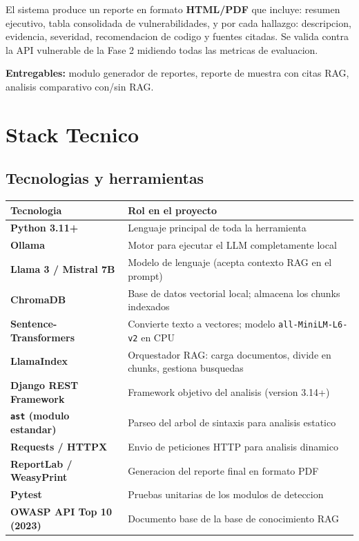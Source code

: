 \documentclass[12pt, a4paper]{article}
\begin{document}
\begin{dangerbox}[title={Fase 7 --- Generacion del reporte y validacion}]
El sistema produce un reporte en formato \textbf{HTML/PDF} que incluye: resumen ejecutivo, tabla consolidada de vulnerabilidades, y por cada hallazgo: descripcion, evidencia, severidad, recomendacion de codigo y fuentes citadas. Se valida contra la API vulnerable de la Fase 2 midiendo todas las metricas de evaluacion.

\smallskip
\textbf{Entregables:} modulo generador de reportes, reporte de muestra con citas RAG, analisis comparativo con/sin RAG.
\end{dangerbox}

\newpage
\section{Stack Tecnico}

\subsection{Tecnologias y herramientas}

\begin{center}
\begin{tabularx}{\linewidth}{>{\bfseries}lL}
\toprule
\textbf{Tecnologia} & \textbf{Rol en el proyecto} \\
\midrule
Python 3.11+ & Lenguaje principal de toda la herramienta \\
Ollama & Motor para ejecutar el LLM completamente local \\
Llama 3 / Mistral 7B & Modelo de lenguaje (acepta contexto RAG en el prompt) \\
ChromaDB & Base de datos vectorial local; almacena los chunks indexados \\
Sentence-Transformers & Convierte texto a vectores; modelo \texttt{all-MiniLM-L6-v2} en CPU \\
LlamaIndex & Orquestador RAG: carga documentos, divide en chunks, gestiona busquedas \\
Django REST Framework & Framework objetivo del analisis (version 3.14+) \\
\texttt{ast} (modulo estandar) & Parseo del arbol de sintaxis para analisis estatico \\
Requests / HTTPX & Envio de peticiones HTTP para analisis dinamico \\
ReportLab / WeasyPrint & Generacion del reporte final en formato PDF \\
Pytest & Pruebas unitarias de los modulos de deteccion \\
OWASP API Top 10 (2023) & Documento base de la base de conocimiento RAG \\
\bottomrule
\end{tabularx}
\end{center}
\end{document}
